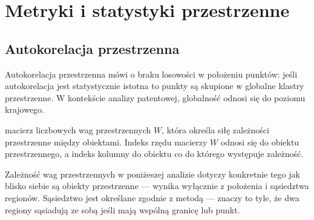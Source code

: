   \section{Metryki i statystyki przestrzenne}


\subsection{Autokorelacja przestrzenna}

Autokorelacja przestrzenna mówi o braku losowości w położeniu punktów:
jeśli autokorelacja jest statystycznie istotna to punkty są skupione w 
globalne klastry przestrzenne\cite{Se-Ar-Da-Wo-20}.
W kontekście analizy patentowej, globalność odnosi się do poziomu krajowego.

{ macierz liczbowych wag przestrzennych $W$,
  która określa siłę zależności przestrzenne między obiektami.
  Indeks rzędu macierzy $W$ odnosi się do obiektu przestrzennego,
  a indeks kolumny do obiektu co do którego występuje zależność.}

Zależność wag przestrzennych w poniżeszej analizie dotyczy 
konkretnie tego jak blisko siebie są obiekty przestrzenne ---
wynika wyłącznie z położenia i sąsiedztwa regionów.
Sąsiedztwo jest określane zgodnie z metodą 
--- znaczy to tyle, że dwa regiony sąsiadują ze sobą
jeśli mają wspólną granicę lub punkt.


